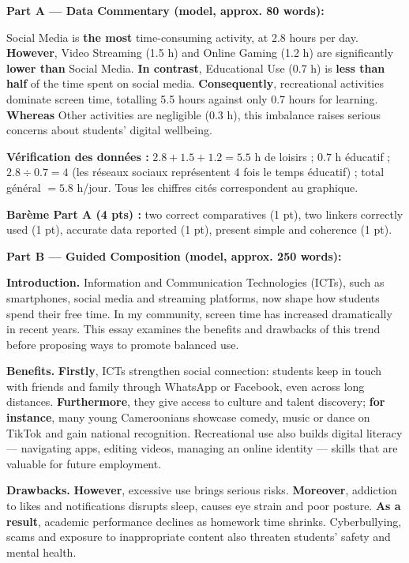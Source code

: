 \documentclass[11pt]{article}
\begin{document}
\begin{corrige}
\textbf{Part A — Data Commentary (model, approx. 80 words):}

Social Media is \textbf{the most} time-consuming activity, at \num{2,8} hours per day. \textbf{However}, Video Streaming (\num{1,5} h) and Online Gaming (\num{1,2} h) are significantly \textbf{lower than} Social Media. \textbf{In contrast}, Educational Use (\num{0,7} h) is \textbf{less than half} of the time spent on social media. \textbf{Consequently}, recreational activities dominate screen time, totalling \num{5,5} hours against only \num{0,7} hours for learning. \textbf{Whereas} Other activities are negligible (\num{0,3} h), this imbalance raises serious concerns about students' digital wellbeing.

\textbf{Vérification des données :} $\num{2,8} + \num{1,5} + \num{1,2} = \num{5,5}$ h de loisirs ; $\num{0,7}$ h éducatif ; $\num{2,8} \div \num{0,7} = 4$ (les réseaux sociaux représentent 4 fois le temps éducatif) ; total général $= \num{5,8}$ h/jour. Tous les chiffres cités correspondent au graphique.

\textbf{Barème Part A (4 pts) :} two correct comparatives (1 pt), two linkers correctly used (1 pt), accurate data reported (1 pt), present simple and coherence (1 pt).

\textbf{Part B — Guided Composition (model, approx. 250 words):}

\textbf{Introduction.} Information and Communication Technologies (ICTs), such as smartphones, social media and streaming platforms, now shape how students spend their free time. In my community, screen time has increased dramatically in recent years. This essay examines the benefits and drawbacks of this trend before proposing ways to promote balanced use.

\textbf{Benefits.} \textbf{Firstly}, ICTs strengthen social connection: students keep in touch with friends and family through WhatsApp or Facebook, even across long distances. \textbf{Furthermore}, they give access to culture and talent discovery; \textbf{for instance}, many young Cameroonians showcase comedy, music or dance on TikTok and gain national recognition. Recreational use also builds digital literacy — navigating apps, editing videos, managing an online identity — skills that are valuable for future employment.

\textbf{Drawbacks.} \textbf{However}, excessive use brings serious risks. \textbf{Moreover}, addiction to likes and notifications disrupts sleep, causes eye strain and poor posture. \textbf{As a result}, academic performance declines as homework time shrinks. Cyberbullying, scams and exposure to inappropriate content also threaten students' safety and mental health.


\end{corrige}
\end{document}
